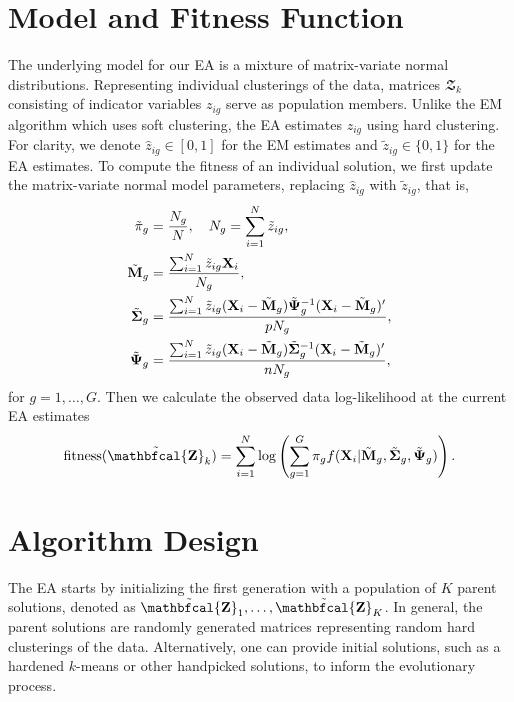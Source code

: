 \documentclass[12pt]{report}
\begin{document}
\section{Model and Fitness Function}
The underlying model for our EA is a mixture of matrix-variate normal distributions. Representing individual clusterings of the data, matrices $\mathbfcal{Z}_k$ consisting of indicator variables $z_{ig}$ serve as population members. Unlike the EM algorithm which uses soft clustering, the EA estimates $z_{ig}$ using hard clustering. For clarity, we denote $\hat{z}_{ig} \in [0, 1]$ for the EM estimates and $\tilde{z}_{ig} \in \{0, 1\}$ for the EA estimates. To compute the fitness of an individual solution, we first update the matrix-variate normal model parameters, replacing $\hat{z}_{ig}$ with $\tilde{z}_{ig}$, that is,
\[
\begin{aligned}
\tilde{\pi}_g & = \frac{N_g}{N}, \quad N_g = \sum_{i=1}^N \tilde{z}_{ig}, \\
\tilde{{\bf M}}_g & = \frac{\sum_{i=1}^N \tilde{z}_{ig}{\bf X}_i}{N_g}, \\
\tilde{{\bf \Sigma}}_g & = \frac{\sum_{i=1}^N \tilde{z}_{ig}({\bf X}_i - \tilde{\bf M}_g) \tilde{\bf \Psi}_g^{-1}({\bf X}_i - \tilde{\bf M}_g)'}{pN_g}, \\
\tilde{{\bf \Psi}}_g & = \frac{\sum_{i=1}^N \tilde{z}_{ig}({\bf X}_i - \tilde{\bf M}_g) \tilde{\bf \Sigma}_g^{-1}({\bf X}_i - \tilde{\bf M}_g)'}{nN_g},
\end{aligned}
\]
for $g = 1, \dots, G$. Then we calculate the observed data log-likelihood at the current EA estimates  
\begin{equation*}
\text{fitness}(\tilde{\bf \mathbfcal{Z}}_k) = \sum_{i=1}^N \log \left (\sum_{g=1}^G\pi_g f({\bf X}_i | \tilde{\bf M}_g, \tilde{\bf \Sigma}_g, \tilde{\bf \Psi}_g)\right).
\end{equation*} 




\section{Algorithm Design}
The EA starts by initializing the first generation with a population of $K$ parent solutions, denoted as $\tilde{\bf \mathbfcal{Z}}_1, \dots, \tilde{\bf \mathbfcal{Z}}_K$. In general, the parent solutions are randomly generated matrices representing random hard clusterings of the data. Alternatively, one can provide initial solutions, such as a hardened $k$-means or other handpicked solutions, to inform the evolutionary process.  
\end{document}
